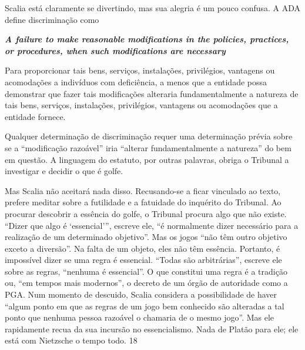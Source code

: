  
\par
 
Scalia está claramente se divertindo, mas sua alegria é um pouco confusa. A ADA define discriminação como
 
\par
 

 \textbf{\textit{A failure to make reasonable modifications in the policies, practices, or procedures, when such modifications are necessary} }  
 
 
\par
 
Para proporcionar tais bens, serviços, instalações, privilégios, vantagens ou acomodações a indivíduos com deficiência, a menos que a entidade possa demonstrar que fazer tais modificações alteraria fundamentalmente a natureza de tais bens, serviços, instalações, privilégios, vantagens ou acomodações que a entidade fornece.
 
\par
 
Qualquer determinação de discriminação requer uma determinação prévia sobre se a “modificação razoável” iria “alterar fundamentalmente a natureza” do bem em questão. A linguagem do estatuto, por outras palavras, obriga o Tribunal a investigar e decidir o que é golfe.
 
\par
 
Mas Scalia não aceitará nada disso. Recusando-se a ficar vinculado ao texto, prefere meditar sobre a futilidade e a fatuidade do inquérito do Tribunal. Ao procurar descobrir a essência do golfe, o Tribunal procura algo que não existe. “Dizer que algo é ‘essencial’”, escreve ele, “é normalmente dizer necessário para a realização de um determinado objetivo”. Mas os jogos “não têm outro objetivo exceto a diversão”. Na falta de um objeto, eles não têm essência. Portanto, é impossível dizer se uma regra é essencial. “Todas são arbitrárias”, escreve ele sobre as regras, “nenhuma é essencial”. O que constitui uma regra é a tradição ou, “em tempos mais modernos”, o decreto de um órgão de autoridade como a PGA. Num momento de descuido, Scalia considera a possibilidade de haver “algum ponto em que as regras de um jogo bem conhecido são alteradas a tal ponto que nenhuma pessoa razoável o chamaria de o mesmo jogo”. Mas ele rapidamente recua da sua incursão no essencialismo. Nada de Platão para ele; ele está com Nietzsche o tempo todo.
 {\color{blue} 18}  

 
\par
 
